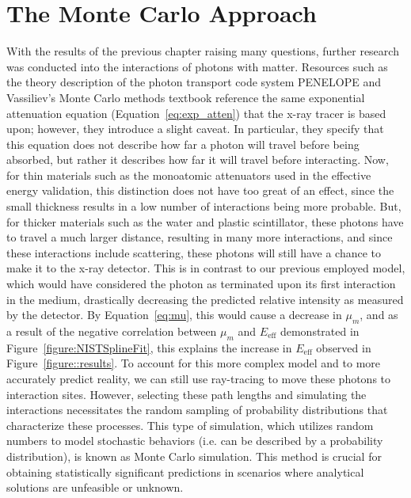 \chapter{The Monte Carlo Approach}
\par With the results of the previous chapter raising many questions, further research was conducted into the interactions of photons with matter. Resources such as the theory description of the photon transport code system PENELOPE \cite{penelope-2018_2019} and Vassiliev's Monte Carlo methods textbook \cite{vassiliev_monte_2017} reference the same exponential attenuation equation (Equation~\ref{eq:exp_atten}) that the x-ray tracer is based upon; however, they introduce a slight caveat. In particular, they specify that this equation does not describe how far a photon will travel before being absorbed, but rather it describes how far it will travel before interacting. Now, for thin materials such as the monoatomic attenuators used in the effective energy validation, this distinction does not have too great of an effect, since the small thickness results in a low number of interactions being more probable. But, for thicker materials such as the water and plastic scintillator, these photons have to travel a much larger distance, resulting in many more interactions, and since these interactions include scattering, these photons will still have a chance to make it to the x-ray detector. This is in contrast to our previous employed model, which would have considered the photon as terminated upon its first interaction in the medium, drastically decreasing the predicted relative intensity as measured by the detector. By Equation~\ref{eq:mu}, this would cause a decrease in $\mu_m$, and as a result of the negative correlation between $\mu_m$ and $E_{\textrm{eff}}$ demonstrated in Figure~\ref{figure:NISTSplineFit}, this explains the increase in $E_{\textrm{eff}}$ observed in Figure~\ref{figure::results}. To account for this more complex model and to more accurately predict reality, we can still use ray-tracing to move these photons to interaction sites. However, selecting these path lengths and simulating the interactions necessitates the random sampling of probability distributions that characterize these processes. This type of simulation, which utilizes random numbers to model stochastic behaviors (i.e. can be described by a probability distribution), is known as Monte Carlo simulation. This method is crucial for obtaining statistically significant predictions in scenarios where analytical solutions are unfeasible or unknown.

